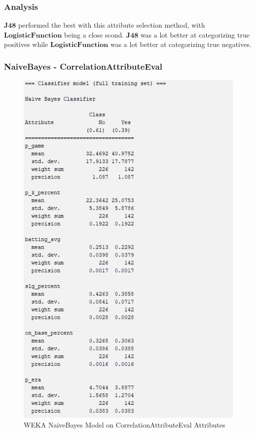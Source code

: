 \documentclass[12pt]{article}
\begin{document}
\newpage
\subsubsection{Analysis}
$\textbf{J48}$ performed the best with this attribute selection method, with $\textbf{LogisticFunction}$ being a close scond. $\textbf{J48}$ was a lot better at categorizing true positives while $\textbf{LogisticFunction}$ was a lot better at categorizing true negatives. 

\newpage
\subsubsection{NaiveBayes - CorrelationAttributeEval}
\begin{figure}[h!]
    \includegraphics[scale=0.4]{./images/CorrelationAttributeEval/NaiveBayes-Model.png}
\centering
    \caption{WEKA NaiveBayes Model on CorrelationAttributeEval Attributes}
\end{figure}
\end{document}
